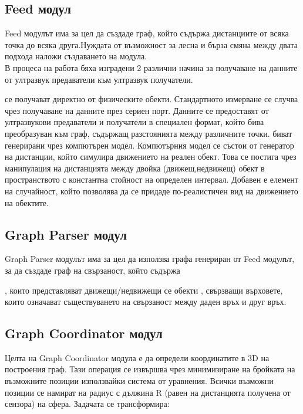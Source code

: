 \subsection{Feed модул}
Feed модулът има за цел да създаде граф, който съдържа дистанциите от всяка точка до всяка друга.Нуждата от възможност за лесна и бърза смяна между двата подхода наложи създаването на модула.\\
В процеса на работа бяха изградени 2 различни начина за получаване на данните от ултразвук предаватели към ултразвук получатели. 
\begin{enumerate}
     се получават директно от физическите обекти. Стандартното измерване се случва чрез получаване на данните през сериен порт. Данните се предоставят от ултразвукови предаватели и получатели в специален формат, който бива преобразуван към граф, съдържащ разстоянията между различните точки.
     биват генерирани чрез компютърен модел. Компютърния модел се състои от генератор на дистанции, който симулира движението на реален обект. Това се постига чрез манипулация на дистанцията между двойка (движещ,недвижещ) обект в пространството с константна стойност на определен интервал. Добавен е елемент на случайност, който позволява да се придаде по-реалистичен вид на движението на обектите.
\end{enumerate}

\subsection{Graph Parser модул}
Graph Parser модулът има за цел да използва графа генериран от Feed модулът, за да създаде граф на свързаност, който съдържа
\begin{enumerate}
, които представляват движещи/недвижещи се обекти 
, свързващи върховете, които означават съществуването на свързаност между
даден връх и друг връх.
\end{enumerate}

\subsection{Graph Coordinator модул}
Целта на Graph Coordinator модула е да определи координатите в 3D на построения граф. Тази операция се извършва чрез минимизиране на бройката на възможните позиции използвайки система от уравнения. Всички възможни позиции се намират на радиус с дължина R (равен на дистанцията получена от сензора) на сфера. Задачата се трансформира:\\

